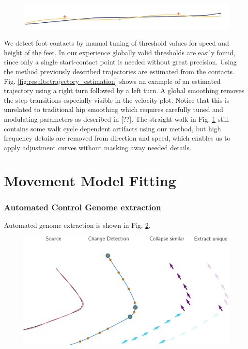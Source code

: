 \begin{figure}
    \centering
    \includegraphics[width=1.0\columnwidth]{img/straight_trajectory.png}
    \caption{}
    \label{fig:results:trajectory_straight}
\end{figure}
We detect foot contacts by manual tuning of threshold values for speed and height of the feet. In our experience globally valid thresholds are easily found, since only a single start-contact point is needed without great precision. Using the method previously described trajectories are estimated from the contacts. Fig. \ref{fig:results:trajectory_estimation} shows an example of an estimated trajectory using a right turn followed by a left turn. A global smoothing removes the step transitions especially visible in the velocity plot. Notice that this is unrelated to traditional hip smoothing which requires carefully tuned and modulating parameters as described in [??]. The straight walk in Fig. \ref{fig:results:trajectory_straight} still contains some walk cycle dependent artifacts using our method, but high frequency details are removed from direction and speed, which enables us to apply adjustment curves without masking away needed details. 

\section{Movement Model Fitting}
\subsubsection{Automated Control Genome extraction}
Automated genome extraction is shown in Fig. \ref{fig:results:genome_extraction}.
\begin{figure}
    \centering
    \includegraphics[width=1.0\columnwidth]{img/genome_extract.png}
    \caption{}
    \label{fig:results:genome_extraction}
\end{figure}
